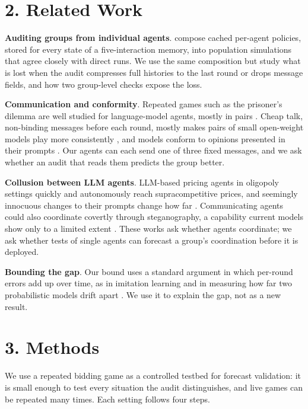 \documentclass[11pt,letterpaper]{article}
\begin{document}
\section{2. Related Work}

\textbf{Auditing groups from individual agents}.
\citet{flint2026} compose cached per-agent policies, stored for every state of a five-interaction memory, into population simulations that agree closely with direct runs.
We use the same composition but study what is lost when the audit compresses full histories to the last round or drops message fields, and how two group-level checks expose the loss.

\textbf{Communication and conformity}.
Repeated games such as the prisoner's dilemma are well studied for language-model agents, mostly in pairs \citep{akata2025}.
Cheap talk, non-binding messages before each round, mostly makes pairs of small open-weight models play more consistently \citep{lore2026}, and models conform to opinions presented in their prompts \citep{bellina2026}.
Our agents can each send one of three fixed messages, and we ask whether an audit that reads them predicts the group better.

\textbf{Collusion between LLM agents}.
LLM-based pricing agents in oligopoly settings quickly and autonomously reach supracompetitive prices, and seemingly innocuous changes to their prompts change how far \citep{fish2024}.
Communicating agents could also coordinate covertly through steganography, a capability current models show only to a limited extent \citep{motwani2024}.
These works ask whether agents coordinate; we ask whether tests of single agents can forecast a group's coordination before it is deployed.

\textbf{Bounding the gap}.
Our bound uses a standard argument in which per-round errors add up over time, as in imitation learning \citep{ross2010} and in measuring how far two probabilistic models drift apart \citep{bian2017}.
We use it to explain the gap, not as a new result.

\section{3. Methods}

We use a repeated bidding game as a controlled testbed for forecast validation: it is small enough to test every situation the audit distinguishes, and live games can be repeated many times.
Each setting follows four steps.
\end{document}

